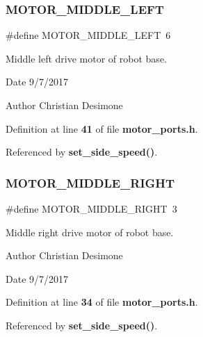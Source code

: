 \subsubsection{M\+O\+T\+O\+R\+\_\+\+M\+I\+D\+D\+L\+E\+\_\+\+L\+E\+FT}
{\footnotesize\ttfamily \#define M\+O\+T\+O\+R\+\_\+\+M\+I\+D\+D\+L\+E\+\_\+\+L\+E\+FT~6}



Middle left drive motor of robot base. 

\begin{DoxyDate}{Date}
9/7/2017 
\end{DoxyDate}
\begin{DoxyAuthor}{Author}
Christian Desimone 
\end{DoxyAuthor}


Definition at line \textbf{ 41} of file \textbf{ motor\+\_\+ports.\+h}.



Referenced by \textbf{ set\+\_\+side\+\_\+speed()}.

\mbox{\label{motor__ports_8h_a0da3f792b8f28ab09b339295859d8334}} 
\subsubsection{M\+O\+T\+O\+R\+\_\+\+M\+I\+D\+D\+L\+E\+\_\+\+R\+I\+G\+HT}
{\footnotesize\ttfamily \#define M\+O\+T\+O\+R\+\_\+\+M\+I\+D\+D\+L\+E\+\_\+\+R\+I\+G\+HT~3}



Middle right drive motor of robot base. 

\begin{DoxyAuthor}{Author}
Christian Desimone 
\end{DoxyAuthor}
\begin{DoxyDate}{Date}
9/7/2017 
\end{DoxyDate}


Definition at line \textbf{ 34} of file \textbf{ motor\+\_\+ports.\+h}.



Referenced by \textbf{ set\+\_\+side\+\_\+speed()}.

